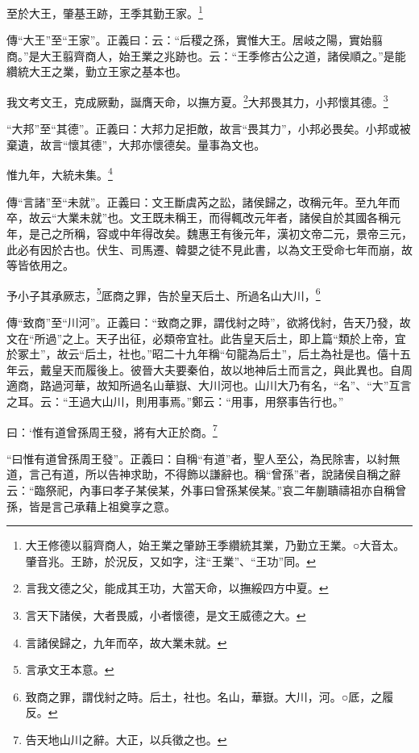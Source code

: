 至於大王，肇基王跡，王季其勤王家。\footnote{大王修德以翦齊商人，始王業之肇跡王季纘統其業，乃勤立王業。○大音太。肇音兆。王跡，於況反，又如字，注“王業”、“王功”同。}

{\noindent\shu{}\fzkt 傳“大王”至“王家”。正義曰：云：“后稷之孫，實惟大王。居岐之陽，實始翦商。”是大王翦齊商人，始王業之兆跡也。云：“王季修古公之道，諸侯順之。”是能纘統大王之業，勤立王家之基本也。 \par}

我文考文王，克成厥勳，誕膺天命，以撫方夏。\footnote{言我文德之父，能成其王功，大當天命，以撫綏四方中夏。}大邦畏其力，小邦懷其德。\footnote{言天下諸侯，大者畏威，小者懷德，是文王威德之大。}

{\noindent\shu{}\fzkt “大邦”至“其德”。正義曰：大邦力足拒敵，故言“畏其力”，小邦必畏矣。小邦或被棄遺，故言“懷其德”，大邦亦懷德矣。量事為文也。 \par}

惟九年，大統未集。\footnote{言諸侯歸之，九年而卒，故大業未就。}

{\noindent\zhuan{}\fzbyks 傳“言諸”至“未就”。正義曰：文王斷虞芮之訟，諸侯歸之，改稱元年。至九年而卒，故云“大業未就”也。文王既未稱王，而得輒改元年者，諸侯自於其國各稱元年，是己之所稱，容或中年得改矣。魏惠王有後元年，漢初文帝二元，景帝三元，此必有因於古也。伏生、司馬遷、韓嬰之徒不見此書，以為文王受命七年而崩，故等皆依用之。 \par}

予小子其承厥志，\footnote{言承文王本意。}厎商之罪，告於皇天后土、所過名山大川，\footnote{致商之罪，謂伐紂之時。后土，社也。名山，華嶽。大川，河。○厎，之履反。}

{\noindent\zhuan{}\fzbyks 傳“致商”至“川河”。正義曰：“致商之罪，謂伐紂之時”，欲將伐紂，告天乃發，故文在“所過”之上。天子出征，必類帝宜社。此告皇天后土，即上篇“類於上帝，宜於冢土”，故云“后土，社也。”昭二十九年稱“句龍為后土”，后土為社是也。僖十五年云，戴皇天而履後上。彼晉大夫要秦伯，故以地神后土而言之，與此異也。自周適商，路過河華，故知所過名山華嶽、大川河也。山川大乃有名，“名”、“大”互言之耳。云：“王過大山川，則用事焉。”鄭云：“用事，用祭事告行也。” \par}

曰：‘惟有道曾孫周王發，將有大正於商。\footnote{告天地山川之辭。大正，以兵徵之也。}

{\noindent\shu{}\fzkt “曰惟有道曾孫周王發”。正義曰：自稱“有道”者，聖人至公，為民除害，以紂無道，言己有道，所以告神求助，不得飾以謙辭也。稱“曾孫”者，說諸侯自稱之辭云：“臨祭祀，內事曰孝子某侯某，外事曰曾孫某侯某。”哀二年蒯聵禱祖亦自稱曾孫，皆是言己承藉上祖奠享之意。 \par}

